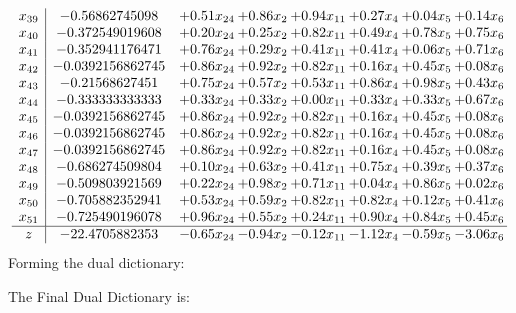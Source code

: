 \documentclass[8pt]{article}
\begin{document}
\[\begin{array}{c| c c@{\hskip 2pt} c@{\hskip 2pt} c@{\hskip 2pt} c@{\hskip 2pt} c@{\hskip 2pt} c@{\hskip 2pt} }
 x_{39}   &  -0.56862745098 & +  0.51 x_{24} & +  0.86 x_{2} & +  0.94 x_{11} & +  0.27 x_{4} & +  0.04 x_{5} & +  0.14 x_{6}\\
 x_{40}   &  -0.372549019608 & +  0.20 x_{24} & +  0.25 x_{2} & +  0.82 x_{11} & +  0.49 x_{4} & +  0.78 x_{5} & +  0.75 x_{6}\\
 x_{41}   &  -0.352941176471 & +  0.76 x_{24} & +  0.29 x_{2} & +  0.41 x_{11} & +  0.41 x_{4} & +  0.06 x_{5} & +  0.71 x_{6}\\
 x_{42}   &  -0.0392156862745 & +  0.86 x_{24} & +  0.92 x_{2} & +  0.82 x_{11} & +  0.16 x_{4} & +  0.45 x_{5} & +  0.08 x_{6}\\
 x_{43}   &  -0.21568627451 & +  0.75 x_{24} & +  0.57 x_{2} & +  0.53 x_{11} & +  0.86 x_{4} & +  0.98 x_{5} & +  0.43 x_{6}\\
 x_{44}   &  -0.333333333333 & +  0.33 x_{24} & +  0.33 x_{2} & +  0.00 x_{11} & +  0.33 x_{4} & +  0.33 x_{5} & +  0.67 x_{6}\\
 x_{45}   &  -0.0392156862745 & +  0.86 x_{24} & +  0.92 x_{2} & +  0.82 x_{11} & +  0.16 x_{4} & +  0.45 x_{5} & +  0.08 x_{6}\\
 x_{46}   &  -0.0392156862745 & +  0.86 x_{24} & +  0.92 x_{2} & +  0.82 x_{11} & +  0.16 x_{4} & +  0.45 x_{5} & +  0.08 x_{6}\\
 x_{47}   &  -0.0392156862745 & +  0.86 x_{24} & +  0.92 x_{2} & +  0.82 x_{11} & +  0.16 x_{4} & +  0.45 x_{5} & +  0.08 x_{6}\\
 x_{48}   &  -0.686274509804 & +  0.10 x_{24} & +  0.63 x_{2} & +  0.41 x_{11} & +  0.75 x_{4} & +  0.39 x_{5} & +  0.37 x_{6}\\
 x_{49}   &  -0.509803921569 & +  0.22 x_{24} & +  0.98 x_{2} & +  0.71 x_{11} & +  0.04 x_{4} & +  0.86 x_{5} & +  0.02 x_{6}\\
 x_{50}   &  -0.705882352941 & +  0.53 x_{24} & +  0.59 x_{2} & +  0.82 x_{11} & +  0.82 x_{4} & +  0.12 x_{5} & +  0.41 x_{6}\\
 x_{51}   &  -0.725490196078 & +  0.96 x_{24} & +  0.55 x_{2} & +  0.24 x_{11} & +  0.90 x_{4} & +  0.84 x_{5} & +  0.45 x_{6}\\
\hline
z    &  -22.4705882353 & -0.65 x_{24} & -0.94 x_{2} & -0.12 x_{11} & -1.12 x_{4} & -0.59 x_{5} & -3.06 x_{6}\\
\end{array}\]
Forming the dual dictionary:

The Final Dual Dictionary is: 
\end{document}
